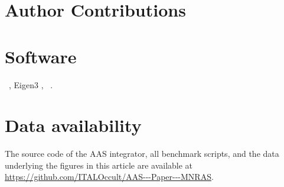 \documentclass[fleqn,usenatbib]{mnras}
\begin{document}
\section*{Author Contributions}


\section*{Software}
\astdyn\ \citep{bigi_astdyn_2025},
Eigen3 \citep{eigenweb},
\rebound\ \citep{ReinLiu2012}.

\section*{Data availability}
The source code of the AAS integrator, all benchmark scripts, 
and the data underlying the figures in this article are available 
at \url{https://github.com/ITALOccult/AAS---Paper---MNRAS}. 



\end{document}
